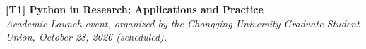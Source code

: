 
\begin{cvparagraph}
  \noindent\textbf{[T1] Python in Research: Applications and Practice}\\
  \textit{Academic Launch event, organized by the Chongqing University Graduate Student Union, October 28, 2026 (scheduled).} 
\end{cvparagraph}
